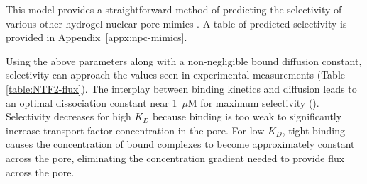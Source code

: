 This model provides a straightforward method of predicting the selectivity of various other hydrogel nuclear pore mimics \cite{frey09,ader10,frey07,kim15}.  A table of predicted selectivity is provided in Appendix~\ref{appx:npc-mimics}.

Using the above parameters along with a non-negligible bound diffusion constant, selectivity can approach the values seen in experimental measurements (Table \ref{table:NTF2-flux}).  The interplay between binding kinetics and diffusion leads to an optimal dissociation constant near 1~$\mu$M for maximum selectivity (). Selectivity decreases for high $K_D$ because binding is too weak to
significantly increase transport factor concentration in the pore.  For low $K_D$, tight binding causes the concentration of bound complexes to become approximately constant across the pore, eliminating the concentration gradient needed to provide flux across the pore.



